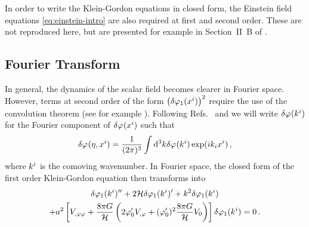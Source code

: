In order to write the Klein-Gordon equations in closed form, the Einstein field
equations \eqref{eq:einstein-intro} are also required at first and second order.
These are not reproduced here, but are presented for example in Section~II~B of
. 

\subsection{Fourier Transform}
\label{sec:fourier-perts}
% 
In general, the dynamics of the scalar field becomes clearer in Fourier space.
However, terms at second order of the form
$\left(\delta\varphi_{1}(x^i)\right)^2$ require the use
of the convolution theorem (see for example ).
Following Refs.~\cite{book:liddle} and \cite{Malik:2006ir} we will write
$\delta\varphi_{}(k^i)$
for the Fourier component of $\delta\varphi_{}(x^i)$ such that
% 
\begin{equation}
 \delta\varphi_{}(\eta, x^i) = \frac{1}{(2 \pi)^3} \int \mathrm{d}^3k \delta\varphi_{}(k^i) \exp (i k_i
x^i)
\,,
\end{equation}
% 
where $k^i$ is the comoving wavenumber.
In Fourier space, the closed form of the first order Klein-Gordon equation then
transforms into
%
\begin{multline}
\label{eq:fokg}
 \delta\varphi_{1}(k^i)'' + 2\mathcal{H} \delta\varphi_{1}(k^i)' + k^2\delta\varphi_{1}(k^i) \\
+ a^2 \left[V_{,\varphi\varphi} +
\frac{8\pi G}{\mathcal{H}}\left(2\varphi_{0}' V_{,\varphi} + (\varphi_{0}')^2\frac{8\pi G
}{\mathcal{H}}V_{0}\right)\right]\delta\varphi_{1}(k^i) = 0 \,.
\end{multline}
%


